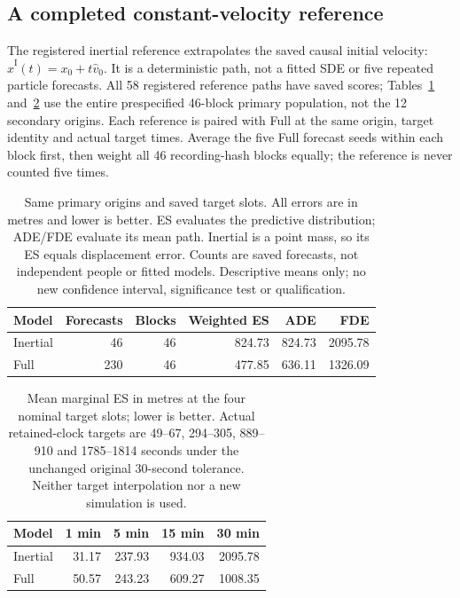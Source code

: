 \FloatBarrier
\subsection{A completed constant-velocity reference}
\label{sec:inertial-primary}
The registered inertial reference extrapolates the saved causal initial velocity: $\widehat x^{\mathrm{I}}(t)=x_0+t\widehat v_0$. It is a deterministic path, not a fitted SDE or five repeated particle forecasts. All 58 registered reference paths have saved scores; Tables~\ref{tab:inertial-primary} and~\ref{tab:inertial-horizons} use the entire prespecified 46-block primary population, not the 12 secondary origins. Each reference is paired with Full at the same origin, target identity and actual target times. Average the five Full forecast seeds within each block first, then weight all 46 recording-hash blocks equally; the reference is never counted five times.

\begin{table}[htbp]\centering\small
\caption{Same primary origins and saved target slots. All errors are in metres and lower is better. ES evaluates the predictive distribution; ADE/FDE evaluate its mean path. Inertial is a point mass, so its ES equals displacement error. Counts are saved forecasts, not independent people or fitted models. Descriptive means only; no new confidence interval, significance test or qualification.}\label{tab:inertial-primary}
\begin{tabular}{@{}lrrrrr@{}}\toprule
Model & Forecasts & Blocks & Weighted ES & ADE & FDE\\\midrule
Inertial & 46 & 46 & 824.73 & 824.73 & 2095.78\\
Full & 230 & 46 & 477.85 & 636.11 & 1326.09\\
\bottomrule\end{tabular}\end{table}

\begin{table}[htbp]\centering\small
\caption{Mean marginal ES in metres at the four nominal target slots; lower is better. Actual retained-clock targets are 49--67, 294--305, 889--910 and 1785--1814 seconds under the unchanged original 30-second tolerance. Neither target interpolation nor a new simulation is used.}\label{tab:inertial-horizons}
\begin{tabular}{@{}lrrrr@{}}\toprule
Model & 1 min & 5 min & 15 min & 30 min\\\midrule
Inertial & 31.17 & 237.93 & 934.03 & 2095.78\\
Full & 50.57 & 243.23 & 609.27 & 1008.35\\
\bottomrule\end{tabular}\end{table}

